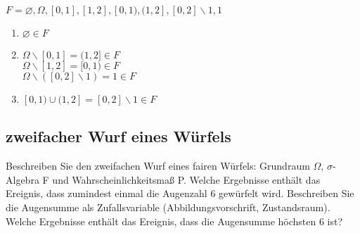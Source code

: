 \documentclass[paper=a4, fontsize=11pt]{scrartcl}
\numberwithin{equation}{section}
\numberwithin{figure}{section}
\numberwithin{table}{section}
\begin{document}
$F={\varnothing,\Omega,[0,1],[1,2],[0,1),(1,2],[0,2] \backslash {1},{1}}$ 

\begin{enumerate}
\item $\varnothing \in F$
\item $\Omega \backslash [0,1] = (1,2] \in F$ \\
         $\Omega \backslash [1,2] = [0,1) \in F$ \\
         $\Omega \backslash ([0,2] \backslash {1}) = {1} \in F$ \\
\item $[0,1) \cup (1,2] = [0,2] \backslash {1} \in F$
\end{enumerate}

\subsection{zweifacher Wurf eines Würfels}
Beschreiben Sie den zweifachen Wurf eines fairen Würfels: Grundraum $ \Omega$, $ \sigma$-Algebra F und Wahrscheinlichkeitsmaß P. Welche Ergebnisse enthält das Ereignis, dass zumindest einmal die Augenzahl 6 gewürfelt wird. Beschreiben Sie die Augensumme als Zufallsvariable (Abbildungsvorschrift, Zustandsraum). Welche Ergebnisse enthält das Ereignis, dass die Augensumme höchsten 6 ist? \\

\end{document}
